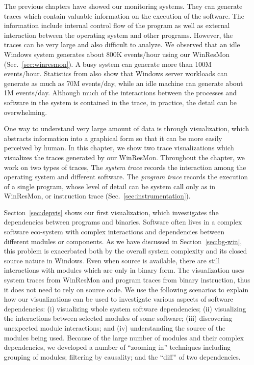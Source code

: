 
The previous chapters have showed our monitoring systems.
They can generate traces which contain valuable information on
the execution of the software.
The information include internal control flow of the program as well
as external interaction between the operating system and other programs.
However, the traces can be very large and also difficult to analyze.
We observed that an idle Windows system generates about 800K
events/hour using our WinResMon (Sec.~\ref{sec:winresmon}).
A busy system can generate more than 100M events/hour.
Statistics from \cite{verbowski6flight} also show that Windows
server workloads can generate as much as 70M events/day,
while an idle machine can generate about 1M events/day.
Although much of the interactions between the processes and software in the
system is contained in the trace, in practice, the detail
can be overwhelming.

One way to understand very large amount of data is through visualization,
which abstracts information into a graphical form so that it can be more
easily perceived by human.
In this chapter, we show two trace visualizations which visualizes
the traces generated by our WinResMon.
Throughout the chapter,
we work on two types of traces,
The {\em system trace} records the interaction among the operating system and
different software.
The {\em program trace} records the execution of a single program,
whose level of detail can be system call only as in WinResMon, or
instruction trace (Sec.~\ref{sec:instrumentation}).

Section~\ref{sec:depvis} shows our first visualization, which
investigates the dependencies between programs and binaries.
Software often lives in a complex software eco-system
with complex interactions and dependencies between different
modules or components.
As we have discussed in Section~\ref{sec:bg-win},
this problem is exacerbated both by the 
overall system complexity and its closed source nature in Windows.
Even when source is available, there are still interactions with
modules which are only in binary form.
The visualization uses system traces from WinResMon and
program traces from binary instruction,
thus it does not need to rely on source code.
We use the following scenarios to explain how our visualizations can
be used to investigate various aspects of software dependencies:
(i) visualizing whole system software dependencies;
(ii) visualizing the interactions between selected modules of some software;
(iii) discovering unexpected module interactions; 
and (iv) understanding the source of the modules being used.
Because of the large number of modules and their complex dependencies,
we developed a number of ``zooming in'' techniques including
grouping of modules;
filtering by causality; and
the ``diff'' of two dependencies.

